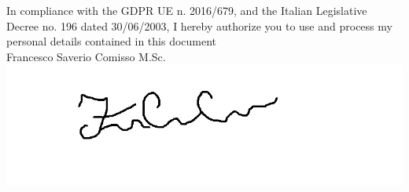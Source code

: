 \documentclass[10pt,a4paper,ragged2e,withhyper]{altacv}
\begin{document}
\begin{paracol}{2}
In compliance with the GDPR UE n. 2016/679, 
and the Italian Legislative Decree no. 196 dated 30/06/2003, 
I hereby authorize you to use and process my personal details contained in this document
\\

Francesco Saverio Comisso M.Sc.
\includegraphics[height=4\baselineskip]{Firma.jpg}






\end{paracol}
\end{document}
